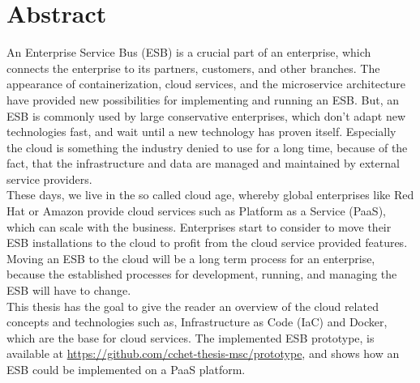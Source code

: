 \chapter{Abstract}
An Enterprise Service Bus (ESB) is a crucial part of an enterprise, which connects the enterprise to its partners, customers, and other branches. The appearance of containerization, cloud services, and the microservice architecture have provided new possibilities for implementing and running an ESB. But, an ESB is commonly used by large conservative enterprises, which don't adapt new technologies fast, and wait until a new technology has proven itself. Especially the cloud is something the industry denied to use for a long time, because of the fact, that the infrastructure and data are managed and maintained by external service providers. \\ 

These days, we live in the so called cloud age, whereby global enterprises like Red Hat or Amazon provide cloud services such as Platform as a Service (PaaS), which can scale with the business. Enterprises start to consider to move their ESB installations to the cloud to profit from the cloud service provided features. Moving an ESB to the cloud will be a long term process for an enterprise, because the established processes for development, running, and managing the ESB will have to change. \\

This thesis has the goal to give the reader an overview of the cloud related concepts and technologies such as, Infrastructure as Code (IaC) and Docker, which are the base for cloud services. The implemented ESB prototype,  is  available at \url{https://github.com/cchet-thesis-msc/prototype}, and shows how an ESB could be implemented on a PaaS platform. \\


